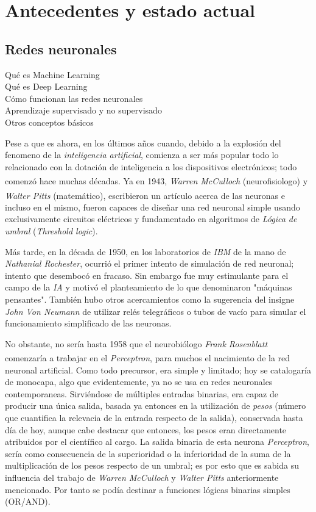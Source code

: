 \chapter{Antecedentes y estado actual}
\section{Redes neuronales}
{\color{red}Qué es Machine Learning}\\
{\color{red}Qué es Deep Learning}\\
{\color{red}Cómo funcionan las redes neuronales}\\
{\color{red}Aprendizaje supervisado y no supervisado}\\
{\color{red}Otros conceptos básicos}

Pese a que es ahora, en los últimos años cuando, debido a la explosión
del fenomeno de la \textit{inteligencia artificial}, comienza a ser
más popular todo lo relacionado con la dotación de inteligencia a
los dispositivos electrónicos; todo comenzó hace muchas décadas\textsuperscript{\cite{na8}}.
Ya en 1943, \textit{Warren McCulloch} (neurofisiologo) y
\textit{Walter Pitts} (matemático),
escribieron un artículo\textsuperscript{\cite{McCulloch}} acerca de las neuronas e incluso en el mismo,
fueron capaces de diseñar una red neuronal simple usando exclusivamente
circuitos eléctricos y fundamentado en algoritmos de \textit{Lógica de umbral}
(\textit{Threshold logic}).


Más tarde, en la década de 1950, en los laboratorios de \textit{IBM} de
la mano de \textit{Nathanial Rochester}, ocurrió el primer
intento de simulación de red neuronal; intento que desembocó en fracaso.
Sin embargo fue muy estimulante para el campo de la \textit{IA}
y motivó el planteamiento de lo que denominaron "máquinas pensantes".
También hubo otros acercamientos como la sugerencia del insigne
\textit{John Von Neumann} de utilizar relés telegráficos o
tubos de vacío para simular el funcionamiento simplificado de
las neuronas.


No obstante, no sería hasta 1958 que el neurobiólogo
\textit{Frank Rosenblatt} comenzaría a trabajar en el \textit{Perceptron}\textsuperscript{\cite{Rosenblatt}},
para muchos el nacimiento de la red neuronal artificial. Como todo precursor,
era simple y limitado; hoy se catalogaría de monocapa, algo que evidentemente,
ya no se usa en redes neuronales contemporaneas.
Sirviéndose de múltiples entradas binarias, era capaz de producir una
única salida, basada ya entonces en la utilización de \textit{pesos}
(número que cuantifica la relevacia de la entrada respecto de la salida),
conservada hasta día de hoy, aunque cabe destacar que entonces, los pesos
eran directamente atribuidos por el científico al cargo.
La salida binaria de esta neurona \textit{Perceptron},
sería como consecuencia de la superioridad o la inferioridad de la
suma de la multiplicación de los pesos respecto de un umbral; es por esto
que es sabida su influencia del trabajo de \textit{Warren McCulloch} y
\textit{Walter Pitts} anteriormente mencionado. Por tanto se podía destinar
a funciones lógicas binarias simples (OR/AND).


